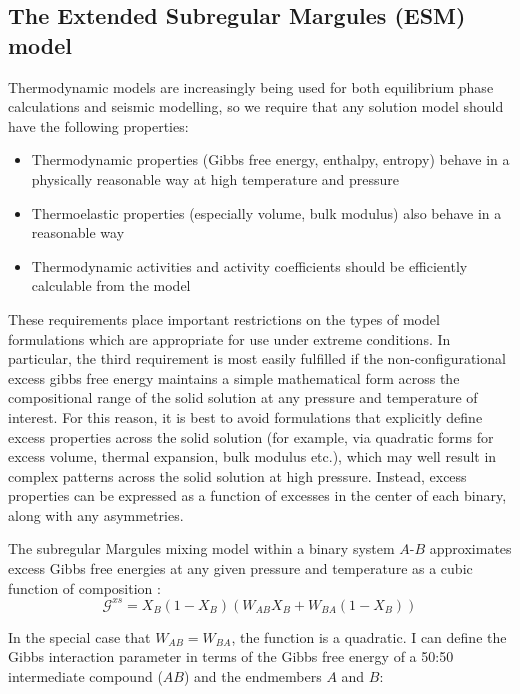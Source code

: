 \subsection{The Extended Subregular Margules (ESM) model}

Thermodynamic models are increasingly being used for both equilibrium phase calculations and seismic modelling, so we require that any solution model should have the following properties:
\begin{itemize}
\item Thermodynamic properties (Gibbs free energy, enthalpy, entropy) behave in a physically reasonable way at high temperature and pressure 
\item Thermoelastic properties (especially volume, bulk modulus) also behave in a reasonable way
\item Thermodynamic activities and activity coefficients should be efficiently calculable from the model
\end{itemize}

These requirements place important restrictions on the types of model formulations which are appropriate for use under extreme conditions. In particular, the third requirement is most easily fulfilled if the non-configurational excess gibbs free energy maintains a simple mathematical form across the compositional range of the solid solution at any pressure and temperature of interest. For this reason, it is best to avoid formulations that explicitly define excess properties across the solid solution (for example, via quadratic forms for excess volume, thermal expansion, bulk modulus etc.), which may well result in complex patterns across the solid solution at high pressure. Instead, excess properties can be expressed as a function of excesses in the center of each binary, along with any asymmetries.


The subregular Margules mixing model within a binary system $A$-$B$ approximates excess Gibbs free energies at any given pressure and temperature as a cubic function of composition \citep{HW1989}:
\begin{equation}
  \mathcal{G}^{xs} = X_B (1-X_B) \left(W_{AB} X_B + W_{BA} (1-X_B) \right)
  \label{eqn:subreg}
\end{equation}

In the special case that $W_{AB} = W_{BA}$, the function is a quadratic. I can define the Gibbs interaction parameter in terms of the Gibbs free energy of a 50:50 intermediate compound ($AB$) and the endmembers $A$ and $B$:

